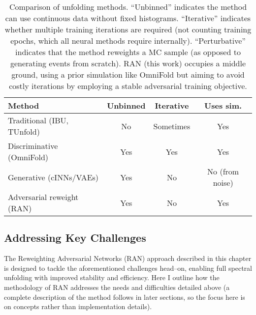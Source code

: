         \begin{table}
            \centering
            \caption{Comparison of unfolding methods. 
            “Unbinned” indicates the method can use continuous data without fixed histograms.
            “Iterative” indicates whether multiple training iterations are required (not counting training epochs, which all neural methods require internally).
            “Perturbative” indicates that the method reweights a MC sample (as opposed to generating events from scratch).
            RAN (this work) occupies a middle ground, using a prior simulation like OmniFold but aiming to avoid costly iterations by employing a stable adversarial training objective.}
            \label{tab:unfold_methods}
            \begin{tabular}{lccc}
                \toprule
                \textbf{Method} & \textbf{Unbinned} & \textbf{Iterative} & \textbf{Uses sim.} \\
                \midrule
                Traditional (IBU, TUnfold) & No & Sometimes & Yes\\
                Discriminative (OmniFold)      & Yes & Yes & Yes \\
                Generative (cINNs/VAEs)             & Yes & No  & No (from noise)\\
                Adversarial reweight (RAN)        & Yes & No  & Yes \\
                \bottomrule
            \end{tabular}
        \end{table}

    \subsection{Addressing Key Challenges}
        The Reweighting Adversarial Networks (RAN) approach described in this chapter is designed to tackle the aforementioned challenges head--on, enabling full spectral unfolding with improved stability and efficiency.
        Here I outline how the methodology of RAN addresses the needs and difficulties detailed above (a complete description of the method follows in later sections, so the focus here is on concepts rather than implementation details).
        
